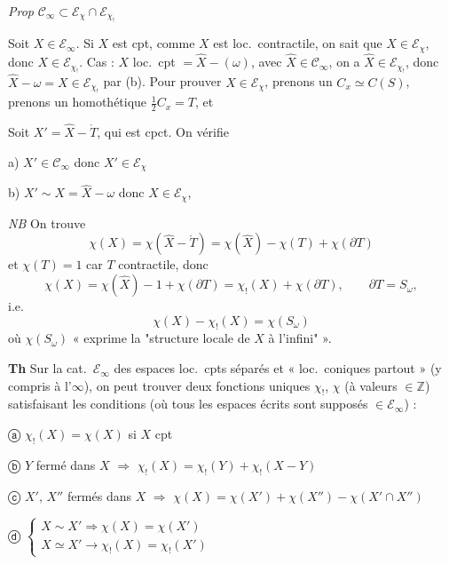 \documentclass[11pt,a4paper]{article}
\begin{document}
\emph{Prop} $\mathcal{C}_\infty \subset \mathcal{E}_\chi \cap \mathcal{E}_{\chi_!}$

Soit $X \in \mathcal{E}_\infty$. Si $X$ est cpt,  comme $X$ est loc.\ contractile, on sait que $X \in \mathcal{E}_\chi$, donc $X \in \mathcal{E}_{\chi_!}$. Cas   : $X$ loc.\ cpt $= \hat{X} - (\omega)$, avec $\hat{X} \in \mathcal{C}_\infty$, on a $\hat{X} \in \mathcal{E}_{\chi_!}$, donc $\hat{X} - \omega = X \in \mathcal{E}_{\chi_!}$ par (b). Pour prouver $X \in \mathcal{E}_\chi$, prenons un $C_x \simeq C(S)$, prenons un homothétique $\frac{1}{2} C_x = T$, et

Soit $X' = \hat{X} - \mathring{T}$, qui est cpct.  On vérifie

a) $X' \in \mathcal{C}_\infty$ donc $X' \in \mathcal{E}_\chi$

b) $X' \sim X = \hat{X} - \omega$ donc $X \in \mathcal{E}_\chi$,

\emph{NB} On trouve
\[
\chi(X) = \chi(\hat{X} - \mathring{T}) = \chi(\hat{X}) - \chi(T) + \chi(\partial T)
\]
et $\chi(T) = 1$ car $T$ contractile, donc
\[
\chi(X) = \chi(\hat{X}) - 1 + \chi(\partial T) = \chi_!(X) + \chi(\partial T), \qquad \partial T = S_\omega,
\]
i.e.
\[
\boxed{\chi(X) - \chi_!(X) = \chi(S_\omega)}
\]
où $\chi(S_\omega)$ « exprime la "structure locale de $X$ à l'infini" ».

\textbf{Th} Sur la cat.\ $\mathcal{E}_\infty$ des espaces loc.\ cpts séparés et \struck{\ill{}} « loc.\ coniques partout » (y compris à l'$\infty$), on peut trouver deux fonctions uniques $\chi_!$, $\chi$ (à valeurs $\in \mathbb{Z}$) satisfaisant les conditions (où tous les espaces écrits sont supposés $\in \mathcal{E}_\infty$) :

ⓐ $\chi_!(X) = \chi(X)$ si $X$ cpt

ⓑ $Y$ fermé dans $X$ $\Longrightarrow$ $\chi_!(X) = \chi_!(Y) + \chi_!(X - Y)$

ⓒ $X'$, $X''$ fermés dans $X$ $\Longrightarrow$ $\chi(X) = \chi(X') + \chi(X'') - \chi(X' \cap X'')$

ⓓ $\begin{cases} X \sim X' \Longrightarrow \chi(X) = \chi(X') \\ X \simeq X' \longrightarrow \chi_!(X) = \chi_!(X') \end{cases}$
\end{document}

